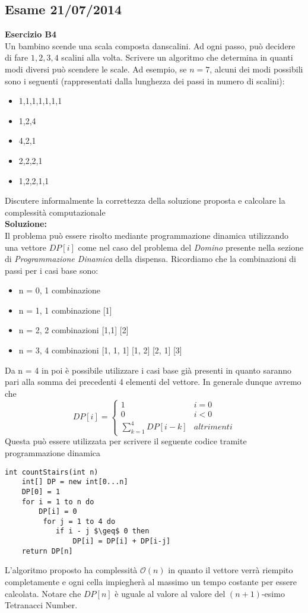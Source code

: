 \documentclass[../cheatSheetAlgoritmi.tex]{subfiles}
\begin{document}
\subsection{Esame 21/07/2014}
\textbf{Esercizio B4}\\
Un bambino scende una scala composta danscalini. Ad ogni passo, può decidere di fare $1,2,3,4$ scalini alla volta. Scrivere un algoritmo che determina in quanti modi diversi può scendere le scale. Ad esempio, se $n= 7$, alcuni dei modi possibili sono i seguenti (rappresentati dalla lunghezza dei passi in numero di scalini):
\begin{itemize}
	\item 1,1,1,1,1,1,1
	\item 1,2,4
	\item 4,2,1
	\item 2,2,2,1
	\item 1,2,2,1,1
\end{itemize}
Discutere informalmente la correttezza della soluzione proposta e calcolare la complessità computazionale\\
\textbf{Soluzione:}\\
Il problema può essere risolto mediante programmazione dinamica utilizzando una vettore $DP[i]$ come nel caso del problema del \emph{Domino} presente nella sezione di \emph{Programmazione Dinamica} della dispensa. Ricordiamo che la combinazioni di passi per i casi base sono:
\begin{itemize}
	\item n = 0, 1 combinazione
	\item n = 1, 1 combinazione 	[1]
	\item n = 2, 2 combinazioni	[1,1] [2]
	\item n = 3, 4 combinazioni	[1, 1, 1] [1, 2] [2, 1] [3]
\end{itemize}
Da n = 4 in poi è possibile utilizzare i casi base già presenti in quanto saranno pari alla somma dei precedenti 4 elementi del vettore. In generale dunque avremo che 
\begin{equation*}
  	DP[i]=\begin{cases}
  		1 & \text{$i = 0$}\\
  		0 & \text{$i < 0$}\\
  		\sum_{k = 1}^{4}{DP[i-k]} & \text{$altrimenti$}
  	\end{cases}
\end{equation*}
Questa può essere utilizzata per scrivere il seguente codice tramite programmazione dinamica
\begin{lstlisting}[caption=modi per scendere le scale]
int countStairs(int n)
	int[] DP = new int[0...n]
	DP[0] = 1
	for i = 1 to n do
		DP[i] = 0
		 for j = 1 to 4 do
		 	if i - j $\geq$ 0 then
		 		DP[i] = DP[i] + DP[i-j]
	return DP[n]
\end{lstlisting}
L'algoritmo proposto ha complessità $\mathcal{O}(n)$ in quanto il vettore verrà riempito completamente e ogni cella impiegherà al massimo un tempo costante per essere calcolata. Notare che $DP[n]$ è uguale al valore al valore del $(n+1)$-esimo Tetranacci Number.
\newpage
\end{document}
